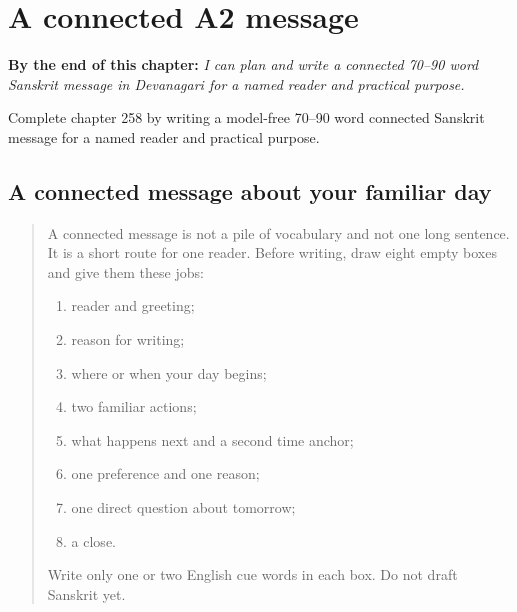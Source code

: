 
\chapter{A connected A2 message}
\label{ch:sa-a-connected-a2-message}

\begin{chapteropening}
\textbf{By the end of this chapter:} \emph{I can plan and write a connected 70–90 word Sanskrit message in Devanagari for a named reader and practical purpose.}

Complete chapter 258 by writing a model-free 70–90 word connected Sanskrit message for a named reader and practical purpose.
\end{chapteropening}

\section[(connected A2 writing)]{A connected message about your familiar day}

\label{lesson:SA-W258-a2-connected-composition}



\begin{quote}
A connected message is not a pile of vocabulary and not one long sentence. It is a short route for one reader. Before writing, draw eight empty boxes and give them these jobs:

\begin{enumerate}
\raggedright
  \item reader and greeting;
  \item reason for writing;
  \item where or when your day begins;
  \item two familiar actions;
  \item what happens next and a second time anchor;
  \item one preference and one reason;
  \item one direct question about tomorrow;
  \item a close.
\end{enumerate}

Write only one or two English cue words in each box. Do not draft Sanskrit yet.
\end{quote}

